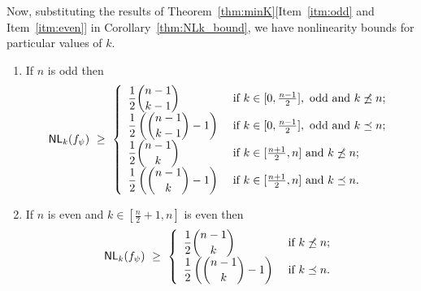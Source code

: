 \documentclass{llncs}
\begin{document}
Now, substituting the results of Theorem~\ref{thm:minK}[Item~\ref{itm:odd} and Item~\ref{itm:even}] in Corollary~\ref{thm:NLk_bound}, we have nonlinearity bounds for particular values of $k$.
\begin{theorem}\label{thm:NLk_bound2}
\begin{enumerate}
\item If $n$ is odd then
$$\mathsf{NL}_{k}(f_\psi) ~\geq ~ 
\left\{ \begin{array}{ll}
\displaystyle{\frac{1}{2}{n-1 \choose k-1}}  & \text{ if }  k \in [0,\frac{n-1}{2}], \text{ odd and } k \not\preceq n; \\
\displaystyle{\frac{1}{2}\left({n-1 \choose k-1} - 1\right)} & \text{ if } k \in [0,\frac{n-1}{2}], \text{ odd and } k \preceq n; \\
\displaystyle{\frac{1}{2}{n-1 \choose k}}  & \text{ if }  k \in [\frac{n+1}{2},n] \text{ and } k \not\preceq n; \\
\displaystyle{\frac{1}{2}\left({n-1 \choose k} - 1\right)}  & \text{ if }  k \in [\frac{n+1}{2},n] \text{ and } k \preceq n.
\end{array}  \right.$$
\item If $n$ is even and $k \in [\frac{n}{2}+1, n]$ is even then 
$$\mathsf{NL}_{k}(f_\psi) ~\geq ~ 
\left\{ \begin{array}{ll}
\displaystyle{\frac{1}{2}{n-1 \choose k}}  & \text{ if }  k \not\preceq n; \\
\displaystyle{\frac{1}{2}\left({n-1 \choose k} - 1\right)} & \text{ if } k \preceq n.
\end{array}  \right.$$
\end{enumerate}
\end{theorem}
\end{document}

